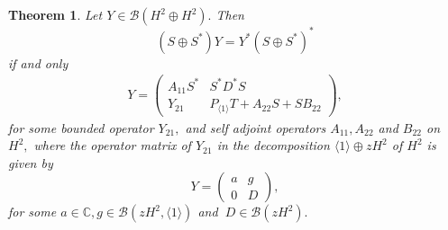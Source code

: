 \documentclass[12pt, reqno]{amsart}
\newtheorem{theorem}{Theorem}[section]
\theoremstyle{definition}
\theoremstyle{remark}
\numberwithin{equation}{section}
\begin{document}
        \begin{theorem}\label{self adjoint S+S*}
             Let $Y\in \mathcal{B}(H^2\oplus H^2).$ Then
           \begin{equation*}
               (S\oplus S^*)Y=Y^*(S\oplus S^*)^*
           \end{equation*}
           if and only
           \begin{align}\label{self adjoin s+s star equation}
               Y=
               \begin{pmatrix}
              A_{11}S^*& S^*D^*S\\
              Y_{21}& P_{\langle 1\rangle}T+A_{22}S+SB_{22}
          \end{pmatrix},
           \end{align}
          for some bounded operator $Y_{21},$ and self adjoint operators $A_{11},A_{22}$ and $B_{22}$ on $H^2,$ where the operator matrix of $Y_{21}$ in the decomposition $\langle1\rangle \oplus zH^2$ of $H^2$ is given by
            \begin{equation*}
            Y=
                \begin{pmatrix}
                    a&g\\
                    0&D
                \end{pmatrix},
            \end{equation*}
            for some 
                $a \in \mathbb{C}, g\in \mathcal{B}(zH^2,\langle1\rangle)$ and $~ D\in \mathcal{B}(zH^2).$
            \end{theorem}
\end{document}
